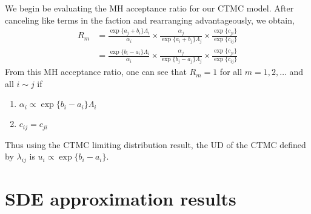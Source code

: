 \documentclass[12pt]{article}
\begin{document}
We begin be evaluating the MH acceptance ratio for our CTMC model. After canceling like terms in the faction and rearranging advantageously, we obtain,
\begin{equation}
\begin{aligned}
R_m &= \frac{\exp\{a_j + b_i\}\Lambda_i}{\alpha_i} \times \frac{\alpha_j}{\exp\{a_i + b_j\}\Lambda_j} \times \frac{\exp\{c_{ji}\}}{\exp\{c_{ij}\}} \\
&= \frac{\exp\{b_i-a_i\}\Lambda_i}{\alpha_i} \times \frac{\alpha_j}{\exp\{b_j-a_j\}\Lambda_j} \times \frac{\exp\{c_{ji}\}}{\exp\{c_{ij}\}}
\end{aligned}
\end{equation}
From this MH acceptance ratio, one can see that $R_m=1$ for all $m = 1,2,\dots$ and all $i\sim j$ if 
\begin{enumerate}
\item $\alpha_i \propto \exp\{b_i-a_i\}\Lambda_i$
\item $c_{ij} = c_{ji}$
\end{enumerate}
Thus using the CTMC limiting distribution result, the UD of the CTMC defined by $\lambda_{ij}$ is $u_i \propto \exp\{b_i-a_i\}$.


\section{SDE approximation results}
\end{document}
